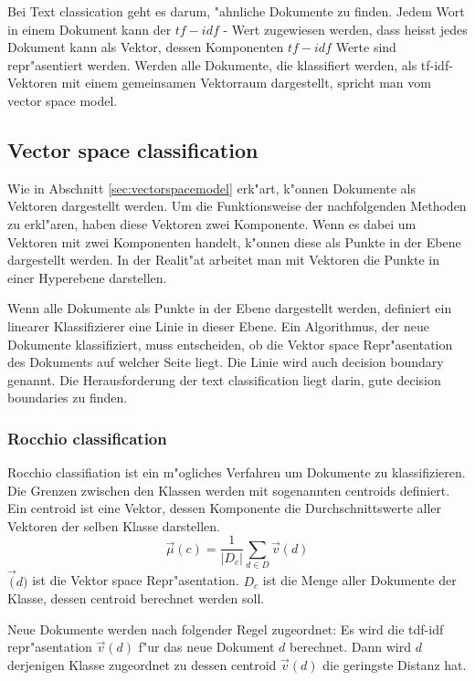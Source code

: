 \documentclass[12pt,a4paper,twoside]{article}
\begin{document}
Bei Text classication geht es darum, "ahnliche Dokumente zu finden. Jedem Wort in einem Dokument kann der $tf-idf$ - Wert zugewiesen werden, dass heisst jedes Dokument kann als Vektor, dessen Komponenten $tf-idf$ Werte sind repr"asentiert werden. Werden alle Dokumente, die klassifiert werden, als tf-idf-Vektoren mit einem gemeinsamen Vektorraum dargestellt, spricht man vom vector space model.

\subsection{Vector space classification}
\label{sec:vectorclassification}

Wie in Abschnitt \ref{sec:vectorspacemodel} erk"art, k"onnen Dokumente als Vektoren dargestellt werden. Um die Funktionsweise der nachfolgenden Methoden zu erkl"aren, haben diese Vektoren zwei Komponente. Wenn es dabei um Vektoren mit zwei Komponenten handelt, k"onnen diese als Punkte in der Ebene dargestellt werden. In der Realit"at arbeitet man mit Vektoren die Punkte in einer Hyperebene darstellen.

Wenn alle Dokumente als Punkte in der Ebene dargestellt werden, de\-finiert ein linearer Klassifizierer eine Linie in dieser Ebene. Ein Algorithmus, der neue Dokumente klassifiziert, muss entscheiden, ob die Vektor space Repr"a\-sentation des Dokuments auf welcher Seite liegt. Die Linie wird auch decision boundary genannt. Die Herausforderung der text classification liegt darin, gute decision boundaries zu finden.


\subsubsection{Rocchio classification}
\label{sec:rocchio}

Rocchio classifiation ist ein m"ogliches Verfahren um Dokumente zu klassifizieren. Die Grenzen zwischen den Klassen werden mit sogenannten centroids definiert. Ein centroid ist eine Vektor, dessen Komponente die Durchschnitts\-werte aller Vektoren der selben Klasse darstellen.
\[
\vec \mu(c) = \frac{1}{|D_c|} \sum_{d \in D} \vec v (d)
\]
$\vec (d)$ ist die Vektor space Repr"asentation. $D_c$ ist die Menge aller Dokumente der Klasse, dessen centroid berechnet werden soll.

Neue Dokumente werden nach folgender Regel zugeordnet: Es wird die tdf-idf repr"asentation $\vec v (d)$ f"ur das neue Dokument $d$ berechnet. Dann wird $d$ derjenigen Klasse zugeordnet zu dessen centroid $\vec v (d)$ die geringste Distanz hat.
\end{document}
